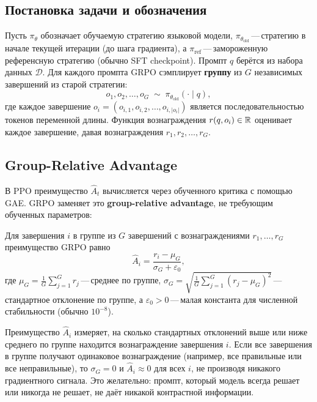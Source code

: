 \subsection{Постановка задачи и обозначения}

Пусть $\pi_\theta$ обозначает обучаемую стратегию языковой модели, $\pi_{\theta_\mathrm{old}}$\,---\,стратегию в начале текущей итерации (до шага градиента), а $\pi_\mathrm{ref}$\,---\,замороженную референсную стратегию (обычно SFT checkpoint). Промпт $q$ берётся из набора данных $\mathcal{D}$. Для каждого промпта GRPO сэмплирует \textbf{группу} из $G$ независимых завершений из старой стратегии:
\begin{equation}
\label{eq:grpo-sampling}
o_1, o_2, \ldots, o_G \;\sim\; \pi_{\theta_\mathrm{old}}(\cdot \mid q),
\end{equation}
где каждое завершение $o_i = (o_{i,1}, o_{i,2}, \ldots, o_{i,|o_i|})$ является последовательностью токенов переменной длины. Функция вознаграждения $r(q, o_i) \in \mathbb{R}$ оценивает каждое завершение, давая вознаграждения $r_1, r_2, \ldots, r_G$.

\subsection{Group-Relative Advantage}

В PPO преимущество $\hat{A}_t$ вычисляется через обученного критика с помощью GAE. GRPO заменяет это \textbf{group-relative advantage}, не требующим обученных параметров:

\begin{definition}
\label{def:grpo-advantage}
Для завершения $i$ в группе из $G$ завершений с вознаграждениями $r_1, \ldots, r_G$ преимущество GRPO равно
\begin{equation}
\label{eq:grpo-advantage}
\hat{A}_i = \frac{r_i - \mu_G}{\sigma_G + \varepsilon_0},
\end{equation}
где $\mu_G = \frac{1}{G}\sum_{j=1}^G r_j$\,---\,среднее по группе, $\sigma_G = \sqrt{\frac{1}{G}\sum_{j=1}^G (r_j - \mu_G)^2}$\,---\,стандартное отклонение по группе, а $\varepsilon_0 > 0$\,---\,малая константа для численной стабильности (обычно $10^{-8}$).
\end{definition}

Преимущество $\hat{A}_i$ измеряет, на сколько стандартных отклонений выше или ниже среднего по группе находится вознаграждение завершения $i$. Если все завершения в группе получают одинаковое вознаграждение (например, все правильные или все неправильные), то $\sigma_G = 0$ и $\hat{A}_i \approx 0$ для всех $i$, не производя никакого градиентного сигнала. Это желательно: промпт, который модель всегда решает или никогда не решает, не даёт никакой контрастной информации.


